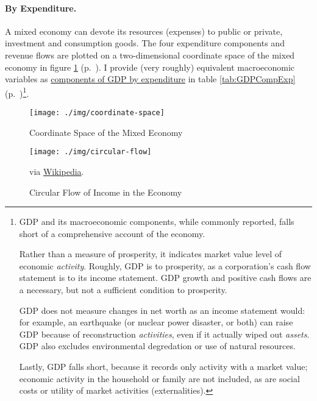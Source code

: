 \paragraph[By Expenditure]{By Expenditure.}  \label{sec:byexpenditure}
A mixed economy can devote its resources (expenses) to public or private, investment and consumption goods. The four expenditure components and revenue flows are plotted on a two-dimensional coordinate space of the mixed economy in figure \ref{fig:coordinate-space} (p.~\pageref{fig:coordinate-space}). I provide (very roughly) equivalent macroeconomic variables as \hyperref[tab:GDPCompExp]{components of GDP by expenditure} in table \ref{tab:GDPCompExp} (p.~\pageref{tab:GDPCompExp})\footnote{
	\gls{GDP} and its macroeconomic components, while commonly reported, falls short of a comprehensive account of the economy.

	Rather than a measure of prosperity, it indicates market value level of economic \emph{activity}. Roughly, \gls{GDP} is to prosperity, as a corporation's cash flow statement is to its income statement. \gls{GDP} growth and positive cash flows are a necessary, but not a sufficient condition to prosperity.

	\gls{GDP} does not measure changes in net worth as an income statement would: for example, an earthquake (or nuclear power disaster, or both) can raise \gls{GDP} because of reconstruction \emph{activities}, even if it actually wiped out \emph{assets}. \gls{GDP} also excludes environmental degredation or use of natural resources.

	Lastly, \gls{GDP} falls short, because it records only activity with a market value; economic activity in the household or family are not included, as are social costs or utility of market activities (externalities).}.

\begin{landscape}
 \begin{figure}[htbp]
	\centering
	\texttt{[image: ./img/coordinate-space]}
	\caption{Coordinate Space of the Mixed Economy}
	\label{fig:coordinate-space}
\end{figure} %
\end{landscape}

\begin{figure}[htbp]
	\centering
	\texttt{[image: ./img/circular-flow]}
	\caption[Circular Flow in the Economy]{Circular Flow of Income in the Economy}
	\begin{flushleft}
		\scriptsize{via \href{http://en.wikipedia.org/wiki/circular-flowofincome}{Wikipedia}}.
	\end{flushleft}
	\label{fig:circular-flow}
\end{figure}

